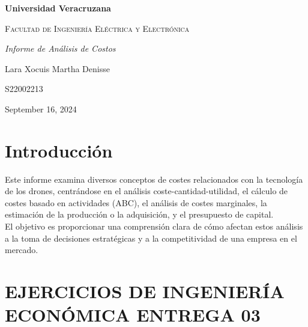 \documentclass[letterpaper,12pt]{article}
\begin{document}
\thispagestyle{empty}
\newpage
\setcounter{page}{1}
\pagestyle{headings}
\begin{sloppypar} 
    \begin{titlepage}
        \hspace{2.5cm}
        {\bfseries\LARGE Universidad Veracruzana \par}
        \hspace{2cm}
        {\scshape\Large Facultad de Ingeniería Eléctrica y Electrónica \par}
        \begin{center}
            \vspace{7cm}
            {\itshape\huge Informe de Análisis de Costos \par}
            {\large Lara Xocuis Martha Denisse\par}
            {\large S22002213 \par}
            \vfill
            {\Large September 16, 2024 \par}
        \end{center}
    \end{titlepage} 

\section*{Introducción}
Este informe examina diversos conceptos de costes relacionados con la tecnología de los drones, centrándose en el análisis coste-cantidad-utilidad, el cálculo de costes basado en actividades (ABC), el análisis de costes marginales, la estimación de la producción o la adquisición, y el presupuesto de capital.
\vspace{0.3cm}\\ 
El objetivo es proporcionar una comprensión clara de cómo afectan estos análisis a la toma de decisiones estratégicas y a la competitividad de una empresa en el mercado.
\newpage
\section*{EJERCICIOS DE INGENIERÍA ECONÓMICA ENTREGA 03}

\end{sloppypar}
\end{document}
